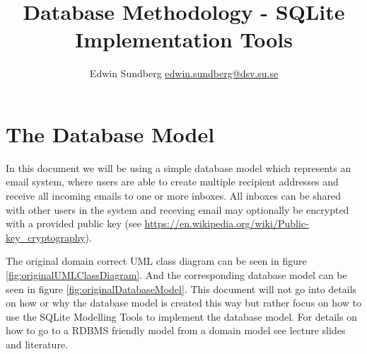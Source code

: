 \documentclass[a4paper,10pt,oneside]{article}
\title{Database Methodology - SQLite Implementation Tools}
\author{Edwin Sundberg \url{edwin.sundberg@dsv.su.se}}
\begin{document}
\maketitle \pagebreak

\tableofcontents \pagebreak



\section{The Database Model}
\label{exampleDatabaseModel}
In this document we will be using a simple database model which represents an email system, where users are able to create multiple recipient addresses and receive all incoming emails to one or more inboxes. All inboxes can be shared with other users in the system and receving email may optionally be encrypted with a provided public key (see \url{https://en.wikipedia.org/wiki/Public-key_cryptography}). 

The original domain correct UML class diagram can be seen in figure \ref{fig:originalUMLClassDiagram}. And the corresponding database model can be seen in figure \ref{fig:originalDatabaseModel}. This document will not go into details on how or why the database model is created this way but rather focus on how to use the SQLite Modelling Tools to implement the database model. For details on how to go to a RDBMS friendly model from a domain model see lecture slides and literature.
\end{document}
